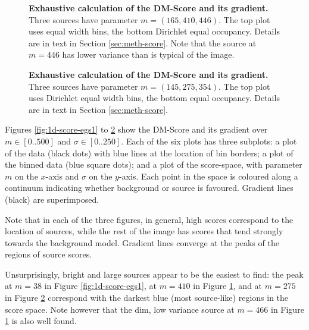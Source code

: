 \begin{figure}
\centering
{}
\caption[Exhaustive calculation of the DM-Score and its gradient (2)]{\textbf{Exhaustive calculation of the DM-Score and its gradient.} Three sources have parameter $m = (165, 410, 446)$. The top plot uses equal width bins, the bottom Dirichlet equal occupancy. Details are in text in Section \ref{sec:meth-score}. Note that the source at $m = 446$ has lower variance than is typical of the image.}
\label{fig:1d-score-egs2}
\end{figure}

\begin{figure}
\centering
{}
\caption[Exhaustive calculation of the DM-Score and its gradient (3)]{\textbf{Exhaustive calculation of the DM-Score and its gradient.} Three sources have parameter $m = (145, 275, 354)$. The top plot uses Dirichlet equal width bins, the bottom equal occupancy. Details are in text in Section \ref{sec:meth-score}.}
\label{fig:1d-score-egs3}
\end{figure}

Figures \ref{fig:1d-score-egs1} to \ref{fig:1d-score-egs3} show the DM-Score and its gradient over $m \in [0..500]$ and $\sigma \in [0..250]$. Each of the six plots has three subplots: a plot of the data (black dots) with blue lines at the location of bin borders; a plot of the binned data (blue square dots); and a plot of the score-space, with parameter $m$ on the $x$-axis and $\sigma$ on the $y$-axis. Each point in the space is coloured along a continuum indicating whether background or source is favoured. Gradient lines (black) are superimposed.  

Note that in each of the three figures, in general, high scores correspond to the location of sources, while the rest of the image has scores that tend strongly towards the background model. Gradient lines converge at the peaks of the regions of source scores.

Unsurprisingly, bright and large sources appear to be the easiest to find: the peak at $m = 38$ in Figure \ref{fig:1d-score-egs1}, at $m = 410$ in Figure \ref{fig:1d-score-egs2}, and at $m = 275$ in Figure \ref{fig:1d-score-egs3} correspond with the darkest blue (most source-like) regions in the score space. Note however that the dim, low variance source at $m = 466$ in Figure \ref{fig:1d-score-egs2} is also well found.

